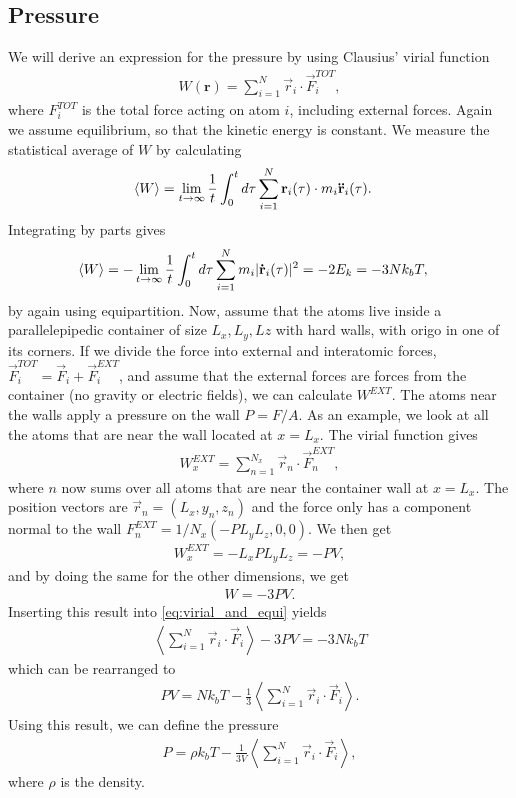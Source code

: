 \subsection{Pressure}
We will derive an expression for the pressure by using Clausius' virial function
\begin{align}
    W(\textbf{r}) = \sum_{i=1}^N \vec r_i \cdot \vec F_i^{TOT},
\end{align}
where $F_i^{TOT}$ is the total force acting on atom $i$, including external forces. Again we assume equilibrium, so that the kinetic energy is constant. We measure the statistical average of $W$ by calculating
\begin{align}
    \langle W \rangle &= \lim_{t\rightarrow\infty} {1\over t} \int_0^t d\tau \sum_{i=1}^N \vec r_i(\tau) \cdot m_i \vec{\ddot r}_i(\tau).
\end{align}
Integrating by parts gives
\begin{align}
    \label{eq:virial_and_equi}
    \langle W \rangle &= -\lim_{t\rightarrow\infty} {1\over t} \int_0^t d\tau \sum_{i=1}^N m_i |\vec{\dot r}_i(\tau)|^2 = -2E_k = -3Nk_bT,
\end{align}
by again using equipartition. Now, assume that the atoms live inside a parallelepipedic container of size $L_x, L_y, Lz$ with hard walls, with origo in one of its corners. If we divide the force into external and interatomic forces, $\vec F_i^{TOT} = \vec F_i + \vec F_i^{EXT}$, and assume that the external forces are forces from the container (no gravity or electric fields), we can calculate $W^{EXT}$. The atoms near the walls apply a pressure on the wall $P = F/A$. As an example, we look at all the atoms that are near the wall located at $x=L_x$. The virial function gives
\begin{align}
    W^{EXT}_x = \sum_{n=1}^{N_x}\vec r_n\cdot \vec F_n^{EXT},
\end{align}
where $n$ now sums over all atoms that are near the container wall at $x=L_x$. The position vectors are $\vec r_n = (L_x, y_n, z_n)$ and the force only has a component normal to the wall $F_n^{EXT} = 1/N_x(-PL_yL_z, 0, 0)$. We then get
\begin{align}
    W^{EXT}_x = -L_xPL_yL_z = -PV,
\end{align}
and by doing the same for the other dimensions, we get
\begin{align}
    W = -3PV.
\end{align}
Inserting this result into \eqref{eq:virial_and_equi} yields
\begin{align}
    \left\langle \sum_{i=1}^N \vec r_i \cdot \vec F_i\right\rangle - 3PV = -3Nk_bT
\end{align}
which can be rearranged to
\begin{align}
    PV = Nk_bT - \frac{1}{3}\left\langle \sum_{i=1}^N \vec r_i \cdot \vec F_i\right\rangle.
\end{align}
Using this result, we can define the pressure
\begin{align}
	P = \rho k_bT - \frac{1}{3V}\left\langle \sum_{i=1}^N \vec r_i \cdot \vec F_i\right\rangle,
\end{align}
where $\rho$ is the density.